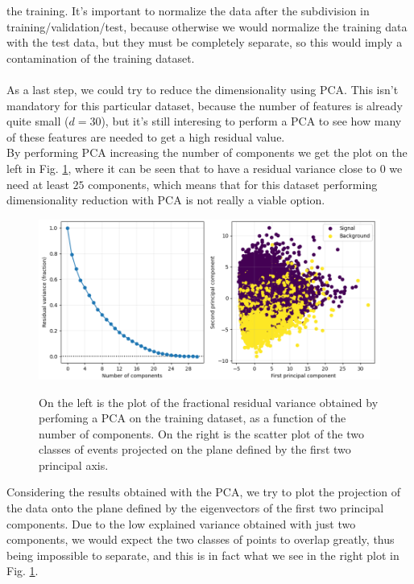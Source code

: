 \documentclass[12pt]{article}
\begin{document}
the training. It's important to normalize the data after the subdivision in training/validation/test, 
because otherwise we would normalize the training data with the test data, but they must be completely 
separate, so this would imply a contamination of the training dataset. \\ \\
As a last step, we could try to reduce the dimensionality using PCA. This isn't mandatory for this particular
dataset, because the number of features is already quite small ($d = 30$), but it's still interesing to 
perform a PCA to see how many of these features are needed to get a high residual value. \\
By performing PCA increasing the number of components we get the plot on the left in Fig. \ref{pca}, 
where it can be seen that to have a residual variance close to $0$ we need at least $25$ components, 
which means that for this dataset performing dimensionality reduction with PCA is not really a viable option.
\begin{figure}
  \centering
  \includegraphics[scale=0.45]{./img/pca.png}
  \label{pca}
  \caption{On the left is the plot of the fractional residual variance obtained by perfoming a PCA on 
  the training dataset, as a function of the number of components. On the right is the scatter plot of 
  the two classes of events projected on the plane defined by the first two principal axis.}
\end{figure}
Considering the results obtained with the PCA, we try to plot the projection of the data onto the plane
defined by the eigenvectors of the first two principal components. Due to the low explained variance 
obtained with just two components, we would expect the two classes of points to overlap greatly, thus 
being impossible to separate, and this is in fact what we see in the right plot in Fig. \ref{pca}.
\end{document}
